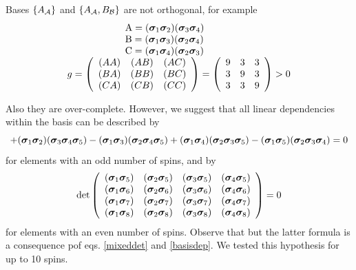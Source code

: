 \documentclass[a4paper]{jpconf}
\renewcommand\[{\begin{equation}}
\renewcommand\]{\end{equation}}
\newcommand{\ssigma}{{\bm \sigma}}
\newcommand{\A}{{\cal A}}
\newcommand{\B}{{\cal B}}
\begin{document}
Bases $\{A_\A\}$ and $\{A_\A,B_\B\}$ are not orthogonal, for example
\[\begin{array}{l}
\qquad \qquad \quad {\rm{A = (}}{{\ssigma}_1}{{\ssigma}_2}{\rm{)(}}{{\ssigma}_3}{{\ssigma}_4}{\rm{)}}\\
\qquad \qquad \quad {\rm{B = (}}{{\ssigma}_1}{{\ssigma}_3}{\rm{)(}}{{\ssigma}_2}{{\ssigma}_4}{\rm{)}}\\
\qquad \qquad \quad {\rm{C = (}}{{\ssigma}_1}{{\ssigma}_4}{\rm{)(}}{{\ssigma}_2}{{\ssigma}_3}{\rm{)}}\\
g = \left( {\begin{array}{*{20}{c}}
	{(AA)}&{(AB)}&{(AC)}\\
	{(BA)}&{(BB)}&{(BC)}\\
	{(CA)}&{(CB)}&{(CC)}
	\end{array}} \right) = \left( {\begin{array}{*{20}{c}}
	9&3&3\\
	3&9&3\\
	3&3&9
	\end{array}} \right) > 0
\end{array}\]

Also they are over-complete. However, we suggest that  all linear dependencies within the basis can be described by 
\[{\rm{ + (}}{{\ssigma}_1}{{\ssigma}_2}{\rm{)(}}{{\ssigma}_3}{{\ssigma}_4}{{\ssigma}_5}{\rm{) - (}}{{\ssigma}_1}{{\ssigma}_3}{\rm{)(}}{{\ssigma}_2}{{\ssigma}_4}{{\ssigma}_5}{\rm{)}} + {\rm{(}}{{\ssigma}_1}{{\ssigma}_4}{\rm{)(}}{{\ssigma}_2}{{\ssigma}_3}{{\ssigma}_5}{\rm{) - (}}{{\ssigma}_1}{{\ssigma}_5}{\rm{)(}}{{\ssigma}_2}{{\ssigma}_3}{{\ssigma}_4}{\rm{)}} = 0
\label{basisdep}
\]
for elements with an odd number of spins, and by
\[\det \left( {\begin{array}{*{20}{c}}
	{{\rm{(}}{{\ssigma}_1}{{\ssigma}_5}{\rm{)}}}&{{\rm{(}}{{\ssigma}_2}{{\ssigma}_5}{\rm{)}}}&{{\rm{(}}{{\ssigma}_3}{{\ssigma}_5}{\rm{)}}}&{{\rm{(}}{{\ssigma}_4}{{\ssigma}_5}{\rm{)}}}\\
	{{\rm{(}}{{\ssigma}_1}{{\ssigma}_6}{\rm{)}}}&{{\rm{(}}{{\ssigma}_2}{{\ssigma}_6}{\rm{)}}}&{{\rm{(}}{{\ssigma}_3}{{\ssigma}_6}{\rm{)}}}&{{\rm{(}}{{\ssigma}_4}{{\ssigma}_6}{\rm{)}}}\\
	{{\rm{(}}{{\ssigma}_1}{{\ssigma}_7}{\rm{)}}}&{{\rm{(}}{{\ssigma}_2}{{\ssigma}_7}{\rm{)}}}&{{\rm{(}}{{\ssigma}_3}{{\ssigma}_7}{\rm{)}}}&{{\rm{(}}{{\ssigma}_4}{{\ssigma}_7}{\rm{)}}}\\
	{{\rm{(}}{{\ssigma}_1}{{\ssigma}_8}{\rm{)}}}&{{\rm{(}}{{\ssigma}_2}{{\ssigma}_8}{\rm{)}}}&{{\rm{(}}{{\ssigma}_3}{{\ssigma}_8}{\rm{)}}}&{{\rm{(}}{{\ssigma}_4}{{\ssigma}_8}{\rm{)}}}
	\end{array}} \right) = 0\]
for elements with an even number of spins. Observe that but the latter formula is a consequence pof eqs. \eqref{mixeddet} and \eqref{basisdep}.
We tested this hypothesis for up to 10 spins. 
\end{document}
